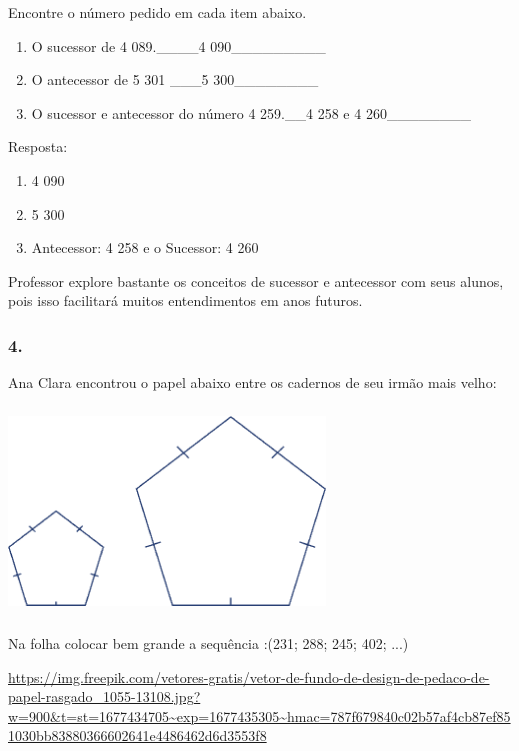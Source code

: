 Encontre o número pedido em cada item abaixo.

\begin{enumerate}
\def\labelenumi{\alph{enumi})}
\item
  O sucessor de 4 089.\_\_\_\_4 090\_\_\_\_\_\_\_\_\_
\item
  O antecessor de 5 301 \_\_\_5 300\_\_\_\_\_\_\_\_
\item
  O sucessor e antecessor do número 4 259.\_\_4 258 e 4
  260\_\_\_\_\_\_\_\_
\end{enumerate}

Resposta:

\begin{enumerate}
\def\labelenumi{\alph{enumi})}
\item
  4 090
\item
  5 300
\item
  Antecessor: 4 258 e o Sucessor: 4 260
\end{enumerate}

Professor explore bastante os conceitos de sucessor e antecessor com
seus alunos, pois isso facilitará muitos entendimentos em anos futuros.

\subsubsection{4.}\label{section-29}

Ana Clara encontrou o papel abaixo entre os cadernos de seu irmão mais
velho:

\protect\hypertarget{_Hlk128407809}{}{}\includegraphics[width=3.30833in,height=2.17391in]{media/image25.png}

Na folha colocar bem grande a sequência :(231; 288; 245; 402; ...)

\url{https://img.freepik.com/vetores-gratis/vetor-de-fundo-de-design-de-pedaco-de-papel-rasgado_1055-13108.jpg?w=900\&t=st=1677434705~exp=1677435305~hmac=787f679840c02b57af4cb87ef851030bb83880366602641e4486462d6d3553f8}

